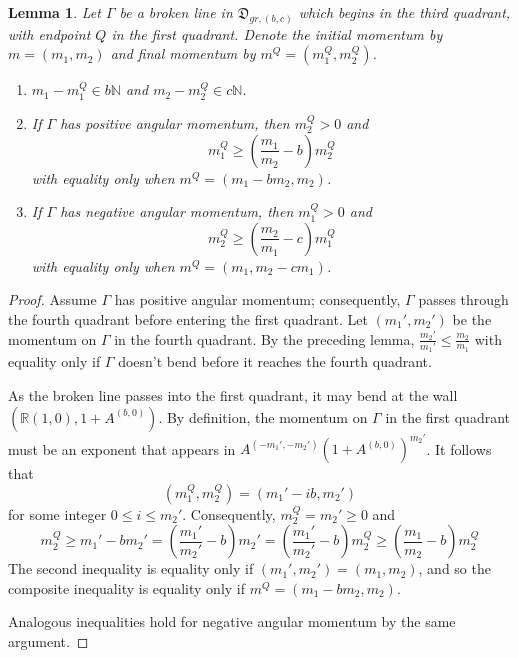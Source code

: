 \documentclass[11pt]{amsart}
\newtheorem{lemma}{Lemma}[section]
\theoremstyle{remark}
\numberwithin{equation}{section}
\begin{document}
\begin{lemma}
Let $\Gamma$ be a broken line in $\mathfrak{D}_{gr,(b,c)}$ which begins in the third quadrant, with endpoint $Q$ in the first quadrant.  Denote the  initial momentum by $m=(m_1,m_2)$ and final momentum by $m^Q=(m_1^Q,m_2^Q)$.  
\begin{enumerate}
	\item $m_1-m_1^Q\in b\mathbb{N}$ and $m_2-m_2^Q\in c\mathbb{N}$.%
	\item If $\Gamma$ has positive angular momentum, then $m_2^Q>0$ and
	\[ m_1^Q\geq\left( \frac{m_1}{m_2}-b\right)m_2^Q\]
	with equality only when $m^Q =( m_1-bm_2,m_2)$.
	\item If $\Gamma$ has negative angular momentum, then $ m_1^Q>0$ and
	\[ m_2^Q\geq\left( \frac{m_2}{m_1}-c\right)m_1^Q\]
	with equality only when $m^Q =( m_1,m_2-cm_1)$.
\end{enumerate}
\end{lemma}
\begin{proof}
Assume $\Gamma$ has positive angular momentum; consequently, $\Gamma$ passes through the fourth quadrant before entering the first quadrant.  Let $(m_1',m_2')$ be the momentum on $\Gamma$ in the fourth quadrant.  By the preceding lemma, $\frac{m_2'}{m_1'}\leq \frac{m_2}{m_1}$ with equality only if $\Gamma$ doesn't bend before it reaches the fourth quadrant.  

As the broken line passes into the first quadrant, it may bend at the wall $(\mathbb{R}(1,0),1+A^{(b,0)})$.  By definition, the momentum on $\Gamma$ in the first quadrant must be an exponent that appears in $A^{(-m_1',-m_2')}(1+A^{(b,0)})^{m_2'}$.  It follows that 
\[ (m_1^Q,m_2^Q) = (m_1'-ib,m_2')\]
for some integer $0\leq i \leq m_2'$.  Consequently, $m_2^Q=m_2'\geq0$ and 
\[ m_2^Q\geq m_1' - bm_2' = \left(\frac{m_1'}{m_2'} - b\right) m_2'  = \left(\frac{m_1'}{m_2'} - b\right) m_2^Q \geq \left(\frac{m_1}{m_2} - b\right) m_2^Q\]
The second inequality is equality only if $(m_1',m_2')=(m_1,m_2)$, and so the composite inequality is equality only if $m^Q =( m_1-bm_2,m_2)$.

Analogous inequalities hold for negative angular momentum by the same argument.
\end{proof}
\end{document}
